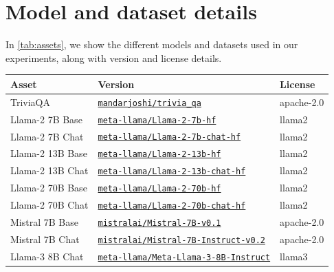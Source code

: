 \newpage
\appendix
\renewcommand{\thesection}{\Alph{section}}





\section{Model and dataset details}\label{app:asset-details}

In \cref{tab:assets}, we show the different models and datasets used in our experiments, along with version and license details.


\begin{table}[h]
    \centering
    \begin{tabular}{lll}
        \toprule
        Asset & Version & License \\
        \midrule
        TriviaQA & \href{https://huggingface.co/datasets/mandarjoshi/trivia_qa}{\texttt{mandarjoshi/trivia\_qa}} & apache-2.0 \\
        Llama-2 7B Base & \href{https://huggingface.co/meta-llama/Llama-2-7b-hf}{\texttt{meta-llama/Llama-2-7b-hf}} & llama2 \\
        Llama-2 7B Chat & \href{https://huggingface.co/meta-llama/Llama-2-7b-chat-hf}{\texttt{meta-llama/Llama-2-7b-chat-hf}} & llama2 \\
        Llama-2 13B Base & \href{https://huggingface.co/meta-llama/Llama-2-13b-hf}{\texttt{meta-llama/Llama-2-13b-hf}} & llama2 \\
        Llama-2 13B Chat & \href{https://huggingface.co/meta-llama/Llama-2-13b-chat-hf}{\texttt{meta-llama/Llama-2-13b-chat-hf}} & llama2 \\
        Llama-2 70B Base & \href{https://huggingface.co/meta-llama/Llama-2-70b-hf}{\texttt{meta-llama/Llama-2-70b-hf}} & llama2 \\
        Llama-2 70B Chat & \href{https://huggingface.co/meta-llama/Llama-2-70b-chat-hf}{\texttt{meta-llama/Llama-2-70b-chat-hf}} & llama2 \\
        Mistral 7B Base & \href{https://huggingface.co/mistralai/Mistral-7B-v0.1}{\texttt{mistralai/Mistral-7B-v0.1}} & apache-2.0 \\
        Mistral 7B Chat & \href{https://huggingface.co/mistralai/Mistral-7B-Instruct-v0.2}{\texttt{mistralai/Mistral-7B-Instruct-v0.2}} & apache-2.0 \\
        Llama-3 8B Chat & \href{https://huggingface.co/meta-llama/Meta-Llama-3-8B-Instruct}{\texttt{meta-llama/Meta-Llama-3-8B-Instruct}} & llama3 \\

\end{tabular}
\end{table}
